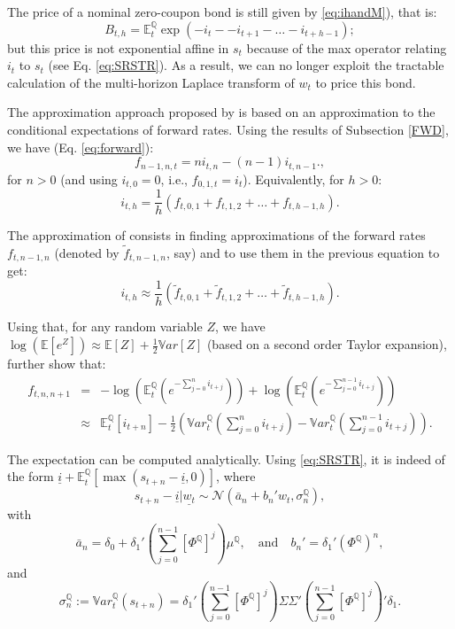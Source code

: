 \documentclass[
  12pt,
]{book}
\theoremstyle{definition}
\theoremstyle{definition}
\theoremstyle{definition}
\theoremstyle{definition}
\theoremstyle{remark}
\begin{document}
The price of a nominal zero-coupon bond is still given by \eqref{eq:ihandM}), that is:
\[
B_{t,h} = \mathbb{E}^{\mathbb{Q}}_t \exp(-i_t--i_{t+1}-\dots-i_{t+h-1});
\]
but this price is not exponential affine in \(s_t\) because of the max operator relating \(i_t\) to \(s_t\) (see Eq. \eqref{eq:SRSTR}). As a result, we can no longer exploit the tractable calculation of the multi-horizon Laplace transform of \(w_t\) to price this bond.

The approximation approach proposed by \citet{Wu_Xia_2016} is based on an approximation to the conditional expectations of forward rates. Using the results of Subsection \ref{FWD}, we have (Eq. \eqref{eq:forward}):
\[
f_{n-1,n,t} = n i_{t,n} - (n-1) i_{t,n-1}.,
\]
for \(n>0\) (and using \(i_{t,0}=0\), i.e., \(f_{0,1,t}=i_t\)). Equivalently, for \(h>0\):
\[
i_{t,h} =  \frac{1}{h}(f_{t,0,1}+f_{t,1,2}+\dots+f_{t,h-1,h}).
\]

The approximation of \citet{Wu_Xia_2016} consists in finding approximations of the forward rates \(f_{t,n-1,n}\) (denoted by \(\tilde{f}_{t,n-1,n}\), say) and to use them in the previous equation to get:
\begin{equation}
i_{t,h} \approx  \frac{1}{h}\left(\tilde{f}_{t,0,1}+\tilde{f}_{t,1,2}+\dots+\tilde{f}_{t,h-1,h}\right).\label{eq:RapproxSR}
\end{equation}

Using that, for any random variable \(Z\), we have \(\log(\mathbb{E}[e^Z]) \approx \mathbb{E}[Z] + \frac{1}{2} \mathbb{V}ar[Z]\) (based on a second order Taylor expansion), \citet{Wu_Xia_2016} further show that:
\begin{eqnarray}
f_{t,n,n+1} &=& -\log\left(\mathbb{E}_t^{\mathbb{Q}}\left(e^{-\sum_{j=0}^n i_{t+j}}\right)\right) + \log\left(\mathbb{E}_t^{\mathbb{Q}}\left(e^{-\sum_{j=0}^{n-1} i_{t+j}}\right)\right)\\
&\approx& \mathbb{E}_t^{\mathbb{Q}}[i_{t+n}] - \frac{1}{2}\left(\mathbb{V}ar_t^{\mathbb{Q}}\left(\sum_{j=0}^n i_{t+j}\right)-\mathbb{V}ar_t^{\mathbb{Q}}\left(\sum_{j=0}^{n-1} i_{t+j}\right)\right).
\end{eqnarray}

The expectation can be computed analytically. Using \eqref{eq:SRSTR}, it is indeed of the form \(\underline{i} + \mathbb{E}_t^{\mathbb{Q}}[ \max(s_{t+n}-\underline{i},0)]\), where
\[
s_{t+n}-\underline{i}|\underline{w_t} \sim \mathcal{N}\left(\bar{a}_n+b_n'w_t,\sigma_n^{\mathbb{Q}}\right),
\]
with
\[
\bar{a}_n = \delta_0 + \delta_1'\left(\sum_{j=0}^{n-1} \left[\Phi^{\mathbb{Q}}\right]^j\right)\mu^{\mathbb{Q}}, \quad \mbox{and} \quad b_n' = \delta_1'\left(\Phi^{\mathbb{Q}}\right)^n,
\]
and
\[
\sigma_n^{\mathbb{Q}} := \mathbb{V}ar^{\mathbb{Q}}_t\left(s_{t+n}\right)= \delta_1'\left(\sum_{j=0}^{n-1} \left[\Phi^{\mathbb{Q}}\right]^j\right)\Sigma \Sigma' \left(\sum_{j=0}^{n-1} \left[\Phi^{\mathbb{Q}}\right]^j\right)'\delta_1.
\]
\end{document}
